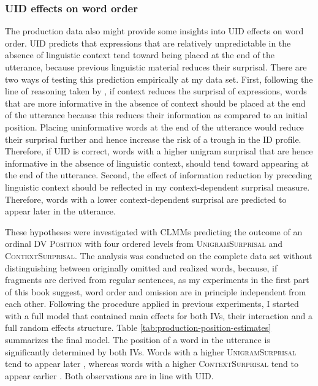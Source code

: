\subsubsection{UID effects on word order}
\label{sec:scripts-production-results-uniformity}
The production data also might provide some insights into UID effects on word order. UID predicts that expressions that are relatively unpredictable in the absence of linguistic context tend toward being placed at the end of the utterance, because previous linguistic material reduces their surprisal. There are two ways of testing this prediction empirically at my data set. First, following the line of reasoning taken by \citet{genzel.charniak2002}, if context reduces the surprisal of expressions, words that are more informative in the absence of context should be placed at the end of the utterance because this reduces their information as compared to an initial position. Placing uninformative words at the end of the utterance would reduce their surprisal further and hence increase the risk of a trough in the ID profile. Therefore, if UID is correct, words with a higher unigram surprisal that are hence informative in the absence of linguistic context, should tend toward appearing at the end of the utterance. Second, the effect of information reduction by preceding linguistic context should be reflected in my context-dependent surprisal measure. Therefore, words with a lower context-dependent surprisal are predicted to appear later in the utterance.

These hypotheses were investigated with CLMMs predicting the outcome of an ordinal DV \textsc{Position} with four ordered levels from \textsc{UnigramSur\-prisal} and \textsc{ContextSurprisal}. The analysis was conducted on the complete data set without distinguishing between originally omitted and realized words, because, if fragments are derived from regular sentences, as my experiments in the first part of this book suggest, word order and omission are in principle independent from each other. Following the procedure applied in previous experiments, I started with a full model that contained main effects for both IVs, their interaction and a full random effects structure. Table \ref{tab:production-position-estimates} summarizes the final model. The position of a word in the utterance is significantly determined by both IVs. Words with a higher \textsc{UnigramSurprisal} tend to appear later , whereas words with a higher \textsc{ContextSurprisal} tend to appear earlier . Both observations are in line with UID.


